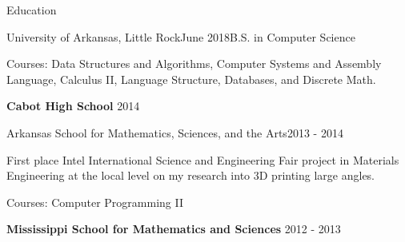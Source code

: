 \documentclass{resume} %
\begin{document}

\begin{rSection}{Education}

\begin{rSubsection}{University of Arkansas, Little Rock}{June 2018}{B.S. in Computer Science}

	\item Courses: Data Structures and Algorithms, Computer Systems and Assembly Language, Calculus II, Language Structure, Databases, and Discrete Math.
\end{rSubsection}

{\bf Cabot High School} \hfill {2014} \hspace{0.0em}

\begin{rSubsection}{Arkansas School for Mathematics, Sciences, and the Arts}{2013 - 2014}{}

	\item First place Intel International Science and Engineering Fair project in Materials Engineering at the local level on my research into 3D printing large angles.
	\item Courses: Computer Programming II
\end{rSubsection}


{\bf Mississippi School for Mathematics and Sciences} \hfill {2012 - 2013} \hspace{0.0em}

\end{rSection}


\clearpage
\end{document}
